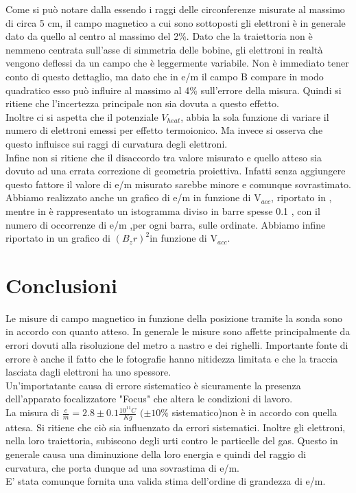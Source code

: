 Come si può notare dalla  essendo i raggi delle circonferenze misurate al massimo di circa 5 cm, il campo magnetico a cui sono sottoposti gli elettroni è in generale dato da quello al centro al massimo del 2\%. Dato che la traiettoria non è nemmeno centrata sull'asse di simmetria delle bobine, gli elettroni in realtà vengono deflessi da un campo che è leggermente variabile. Non è immediato tener conto di questo dettaglio, ma dato che in e/m il campo B compare in modo quadratico esso può influire al massimo al 4\% sull'errore della misura. Quindi si ritiene che l'incertezza principale non sia dovuta a questo effetto. \\
Inoltre ci si aspetta che il potenziale $V_{heat}$, abbia la sola funzione di variare il numero di elettroni emessi per effetto termoionico. Ma invece si osserva che questo influisce sui raggi di curvatura degli elettroni.\\
Infine non si ritiene che il disaccordo tra valore misurato e quello atteso sia dovuto ad una errata correzione di geometria proiettiva. Infatti senza aggiungere questo fattore il valore di e/m misurato sarebbe minore e comunque sovrastimato.
Abbiamo realizzato anche un grafico di e/m in funzione di V$_{acc}$, riportato in , mentre in  è rappresentato un istogramma diviso in barre spesse 0.1 , con il numero di occorrenze di e/m ,per ogni barra, sulle ordinate. Abbiamo infine riportato in  un grafico di ${(B_z r)}^2$in funzione di V$_{acc}$.

\section{Conclusioni}
Le misure di campo magnetico in funzione della posizione tramite la sonda sono in accordo con quanto atteso.
In generale le misure sono affette principalmente da errori dovuti alla risoluzione del metro a nastro e dei righelli. Importante fonte di errore è anche il fatto che le fotografie hanno nitidezza limitata e che la traccia lasciata dagli elettroni ha uno spessore.\\
Un'importatante causa di errore sistematico è sicuramente la presenza dell'apparato focalizzatore "Focus" che altera le condizioni di lavoro.\\
La misura di $\frac{e}{m} = 2.8 \pm 0.1 \frac{10^{11} C}{Kg}$ $(\pm 10\%$ sistematico)non è in accordo con quella attesa. Si ritiene che ciò sia influenzato da errori sistematici. Inoltre gli elettroni, nella loro traiettoria, subiscono degli urti contro le particelle del gas. Questo in generale causa una diminuzione della loro energia e quindi del raggio di curvatura, che porta dunque ad una sovrastima di e/m.\\
E' stata comunque fornita una valida stima dell'ordine di grandezza di e/m.